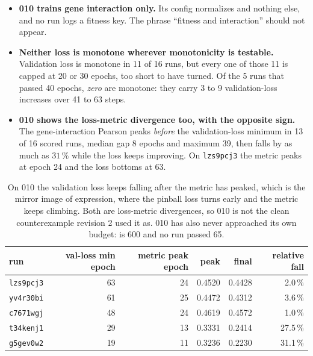 \begin{itemize}
\item \textbf{010 trains gene interaction only.} Its config normalizes
   and nothing else, and no run logs a fitness key. The phrase
  ``fitness and interaction'' should not appear.
\item \textbf{Neither loss is monotone wherever monotonicity is testable.} Validation loss
  is monotone in 11 of 16 runs, but every one of those 11 is capped at 20 or 30 epochs, too
  short to have turned. Of the 5 runs that passed 40 epochs, \emph{zero} are monotone: they
  carry 3 to 9 validation-loss increases over 41 to 63 steps.
\item \textbf{010 shows the loss-metric divergence too, with the opposite sign.} The
  gene-interaction Pearson peaks \emph{before} the validation-loss minimum in 13 of 16
  scored runs, median gap 8 epochs and maximum 39, then falls by as much as $31\,\%$ while
  the loss keeps improving. On \texttt{lzs9pcj3} the metric peaks at epoch 24 and the loss
  bottoms at 63.
\end{itemize}

\begin{table}[htbp]
\centering\small
\begin{tabular}{lrrrrr}
\toprule
run & val-loss min epoch & metric peak epoch & peak & final & relative fall \\
\midrule
\texttt{lzs9pcj3} & 63 & 24 & 0.4520 & 0.4428 & 2.0\,\% \\
\texttt{yv4r30bi} & 61 & 25 & 0.4472 & 0.4312 & 3.6\,\% \\
\texttt{c7671wgj} & 48 & 24 & 0.4619 & 0.4572 & 1.0\,\% \\
\texttt{t34kenj1} & 29 & 13 & 0.3331 & 0.2414 & 27.5\,\% \\
\texttt{g5gev0w2} & 19 & 11 & 0.3236 & 0.2230 & 31.1\,\% \\
\bottomrule
\end{tabular}
\caption[]{On 010 the validation loss keeps falling after the metric has peaked, which is
the mirror image of expression, where the pinball loss turns early and the metric keeps
climbing. Both are loss-metric divergences, so 010 is not the clean counterexample revision
2 used it as. 010 has also never approached its own budget:  is
600 and no run passed 65.}
\label{tab:010-divergence}
\end{table}

